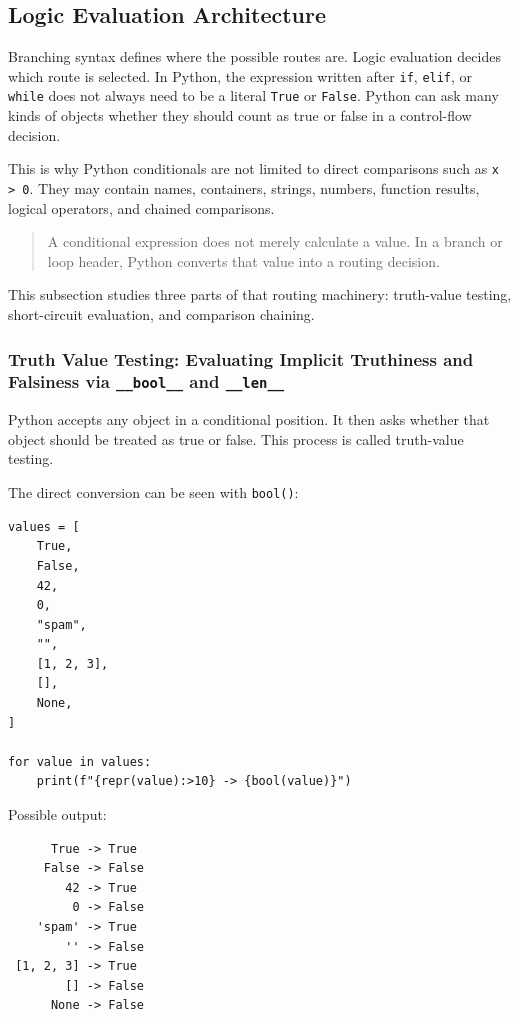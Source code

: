 \subsection{Logic Evaluation Architecture}

Branching syntax defines where the possible routes are. Logic evaluation decides which route is selected. In Python, the expression written after \texttt{if}, \texttt{elif}, or \texttt{while} does not always need to be a literal \texttt{True} or \texttt{False}. Python can ask many kinds of objects whether they should count as true or false in a control-flow decision.

This is why Python conditionals are not limited to direct comparisons such as \texttt{x > 0}. They may contain names, containers, strings, numbers, function results, logical operators, and chained comparisons.

\begin{quote}
A conditional expression does not merely calculate a value. In a branch or loop header, Python converts that value into a routing decision.
\end{quote}

This subsection studies three parts of that routing machinery: truth-value testing, short-circuit evaluation, and comparison chaining.

\subsubsection{Truth Value Testing: Evaluating Implicit Truthiness and Falsiness via \texttt{\_\_bool\_\_} and \texttt{\_\_len\_\_}}

Python accepts any object in a conditional position. It then asks whether that object should be treated as true or false. This process is called truth-value testing.

The direct conversion can be seen with \texttt{bool()}:

\begin{verbatim}
values = [
    True,
    False,
    42,
    0,
    "spam",
    "",
    [1, 2, 3],
    [],
    None,
]

for value in values:
    print(f"{repr(value):>10} -> {bool(value)}")
\end{verbatim}

Possible output:

\begin{verbatim}
      True -> True
     False -> False
        42 -> True
         0 -> False
    'spam' -> True
        '' -> False
 [1, 2, 3] -> True
        [] -> False
      None -> False
\end{verbatim}

